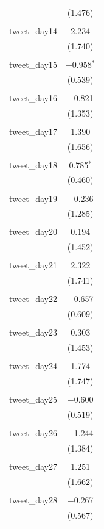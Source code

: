 \documentclass{article}
\begin{document}
\begin{longtable}{@{\extracolsep{10pt}}lc}
  & (1.476) \\ 
  & \\ 
 tweet\_day14 & 2.234 \\ 
  & (1.740) \\ 
  & \\ 
 tweet\_day15 & $-$0.958$^{*}$ \\ 
  & (0.539) \\ 
  & \\ 
 tweet\_day16 & $-$0.821 \\ 
  & (1.353) \\ 
  & \\ 
 tweet\_day17 & 1.390 \\ 
  & (1.656) \\ 
  & \\ 
 tweet\_day18 & 0.785$^{*}$ \\ 
  & (0.460) \\ 
  & \\ 
 tweet\_day19 & $-$0.236 \\ 
  & (1.285) \\ 
  & \\ 
 tweet\_day20 & 0.194 \\ 
  & (1.452) \\ 
  & \\ 
 tweet\_day21 & 2.322 \\ 
  & (1.741) \\ 
  & \\ 
 tweet\_day22 & $-$0.657 \\ 
  & (0.609) \\ 
  & \\ 
 tweet\_day23 & 0.303 \\ 
  & (1.453) \\ 
  & \\ 
 tweet\_day24 & 1.774 \\ 
  & (1.747) \\ 
  & \\ 
 tweet\_day25 & $-$0.600 \\ 
  & (0.519) \\ 
  & \\ 
 tweet\_day26 & $-$1.244 \\ 
  & (1.384) \\ 
  & \\ 
 tweet\_day27 & 1.251 \\ 
  & (1.662) \\ 
  & \\ 
 tweet\_day28 & $-$0.267 \\ 
  & (0.567) \\ 

\end{longtable}
\end{document}
